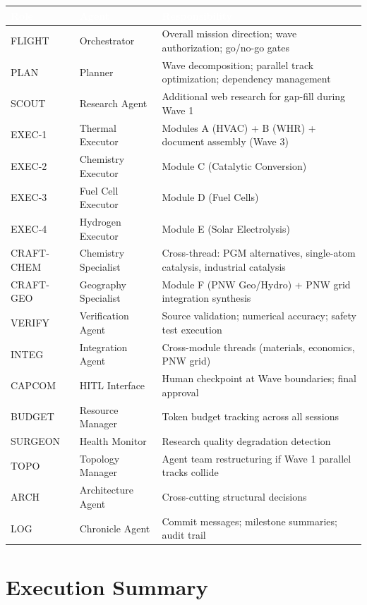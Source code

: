 \documentclass[11pt,letterpaper]{article}
\newcommand{\tableheader}[1]{\textbf{\sffamily\textcolor{white}{#1}}}
\begin{document}
\begin{center}
\begin{tabularx}{\textwidth}{L{2cm}L{3cm}X}
\toprule
{}
\tableheader{Role} & \tableheader{Agent} & \tableheader{Responsibility} \\
\midrule
FLIGHT & Orchestrator & Overall mission direction; wave authorization; go/no-go gates \\
PLAN & Planner & Wave decomposition; parallel track optimization; dependency management \\
SCOUT & Research Agent & Additional web research for gap-fill during Wave 1 \\
EXEC-1 & Thermal Executor & Modules A (HVAC) + B (WHR) + document assembly (Wave 3) \\
EXEC-2 & Chemistry Executor & Module C (Catalytic Conversion) \\
EXEC-3 & Fuel Cell Executor & Module D (Fuel Cells) \\
EXEC-4 & Hydrogen Executor & Module E (Solar Electrolysis) \\
CRAFT-CHEM & Chemistry Specialist & Cross-thread: PGM alternatives, single-atom catalysis, industrial catalysis \\
CRAFT-GEO & Geography Specialist & Module F (PNW Geo/Hydro) + PNW grid integration synthesis \\
VERIFY & Verification Agent & Source validation; numerical accuracy; safety test execution \\
INTEG & Integration Agent & Cross-module threads (materials, economics, PNW grid) \\
CAPCOM & HITL Interface & Human checkpoint at Wave boundaries; final approval \\
BUDGET & Resource Manager & Token budget tracking across all sessions \\
SURGEON & Health Monitor & Research quality degradation detection \\
TOPO & Topology Manager & Agent team restructuring if Wave 1 parallel tracks collide \\
ARCH & Architecture Agent & Cross-cutting structural decisions \\
LOG & Chronicle Agent & Commit messages; milestone summaries; audit trail \\
\bottomrule
\end{tabularx}
\end{center}

\section{Execution Summary}
\end{document}
